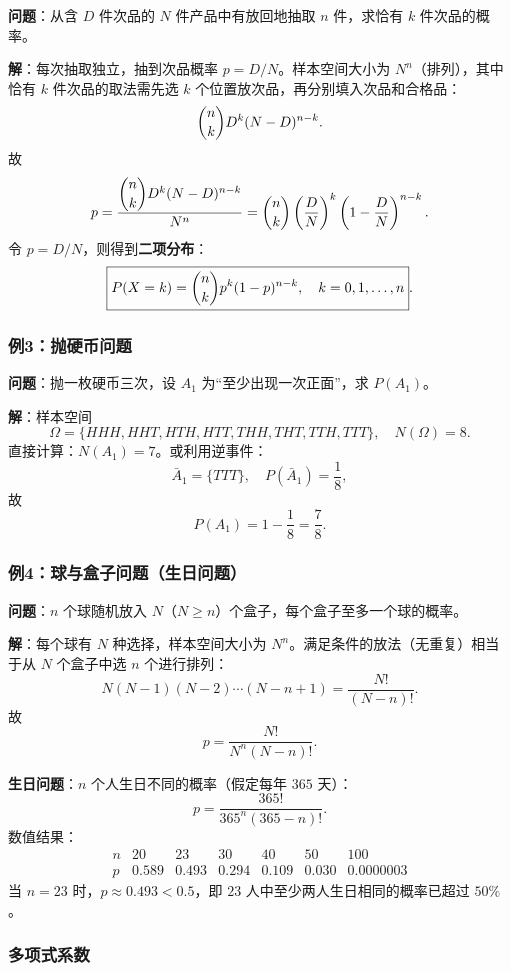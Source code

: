 \documentclass[11pt,a4paper]{report}
\theoremstyle{definition}
\begin{document}
\textbf{问题}：从含 $D$ 件次品的 $N$ 件产品中有放回地抽取 $n$ 件，求恰有 $k$ 件次品的概率。

\textbf{解}：每次抽取独立，抽到次品概率 $p = D/N$。样本空间大小为 $N^n$（排列），其中恰有 $k$ 件次品的取法需先选 $k$ 个位置放次品，再分别填入次品和合格品：
\[
\dbinom{n}{k} D^k (N-D)^{n-k}.
\]
故
\[
p = \frac{\dbinom{n}{k} D^k (N-D)^{n-k}}{N^n} = \dbinom{n}{k} \left(\frac{D}{N}\right)^k \left(1-\frac{D}{N}\right)^{n-k}.
\]
令 $p = D/N$，则得到\textbf{二项分布}：
\[
\boxed{P(X=k) = \dbinom{n}{k} p^k (1-p)^{n-k}, \quad k=0,1,\dots,n}.
\]

\subsubsection{例3：抛硬币问题}

\textbf{问题}：抛一枚硬币三次，设 $A_1$ 为``至少出现一次正面''，求 $P(A_1)$。

\textbf{解}：样本空间
\[
\Omega = \{HHH, HHT, HTH, HTT, THH, THT, TTH, TTT\}, \quad N(\Omega) = 8.
\]
直接计算：$N(A_1) = 7$。或利用逆事件：
\[
\bar{A}_1 = \{TTT\}, \quad P(\bar{A}_1) = \frac{1}{8},
\]
故
\[
\boxed{P(A_1) = 1 - \frac{1}{8} = \frac{7}{8}}.
\]

\subsubsection{例4：球与盒子问题（生日问题）}

\textbf{问题}：$n$ 个球随机放入 $N$（$N \geq n$）个盒子，每个盒子至多一个球的概率。

\textbf{解}：每个球有 $N$ 种选择，样本空间大小为 $N^n$。满足条件的放法（无重复）相当于从 $N$ 个盒子中选 $n$ 个进行排列：
\[
N(N-1)(N-2)\cdots(N-n+1) = \frac{N!}{(N-n)!}.
\]
故
\[
\boxed{p = \frac{N!}{N^n (N-n)!}}.
\]

\textbf{生日问题}：$n$ 个人生日不同的概率（假定每年 $365$ 天）：
\[
p = \frac{365!}{365^n (365-n)!}.
\]
数值结果：
\[
\begin{array}{c|cccccc}
n & 20 & 23 & 30 & 40 & 50 & 100 \\ \hline
p & 0.589 & 0.493 & 0.294 & 0.109 & 0.030 & 0.0000003
\end{array}
\]
当 $n=23$ 时，$p \approx 0.493 < 0.5$，即 $23$ 人中至少两人生日相同的概率已超过 $50\%$。

\subsubsection{多项式系数}
\end{document}
